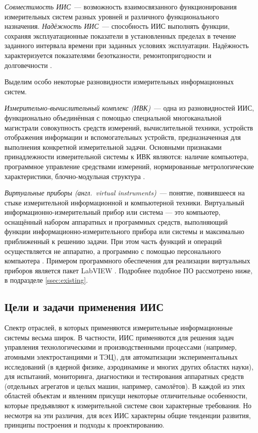 \documentclass[a4paper, 14pt, titlepage]{extarticle}
\newcommand{\eng}[1]{\foreignlanguage{english}{#1}}
\newcommand{\term}[1]{\emph{#1}}
\begin{document}
  \term{Совместимость ИИС}~--- возможность взаимосвязанного функционирования измерительных систем разных уровней и
  различного функционального назначения.
  \term{Надёжность ИИС}~--- способность ИИС выполнять функции, сохраняя эксплуатационные показатели
  в установленных пределах в течение заданного интервала времени при заданных условиях эксплуатации.
  Надёжность характеризуется показателями безотказности, ремонтопригодности и долговечности
  \cite[с.~5--7]{rannev-iis}.

  Выделим особо некоторые разновидности измерительных информационных систем.

  \term{Измерительно-вычислительный комплекс (ИВК)}~--- одна из разновидностей ИИС, функционально
  объединённая с помощью специальной многоканальной магистрали совокупность средств
  измерений, вычислительной техники, устройств отображения информации и вспомогательных устройств,
  предназначенная для выполнения конкретной измерительной задачи. Основными признаками
  принадлежности измерительной системы к ИВК являются: наличие компьютера, программное управление
  средствами измерений, нормированные метрологические характеристики, блочно-модульная структура \cite[с.~225]{rannev-iis}.

  \term{Виртуальные приборы (англ.~\eng{virtual instruments})}~--- понятие, появившееся на стыке
  измерительной информационной и компьютерной техники. Виртуальный информационно-измерительный
  прибор или система — это компьютер, оснащённый набором аппаратных и программных средств,
  выполняющий функции информационно-измерительного прибора или системы и максимально приближенный к
  решению задачи. При этом часть функций и операций осуществляется не аппаратно, а программно с
  помощью персонального компьютера \cite[с.~209]{rannev-iis}. Примером программного обеспечения для
  реализации виртуальных приборов является пакет LabVIEW \cite{lavrov-labview}. Подробнее подобное
  ПО рассмотрено ниже, в подразделе \ref{ssec:existing}.

  \subsection{Цели и задачи применения ИИС}

  Спектр отраслей, в которых применяются измерительные информационные системы весьма широк.
  В частности, ИИС применяются для решения задач управления технологическими и
  производственными процессами (например, атомными электростанциями и ТЭЦ), для автоматизации экспериментальных
  исследований (в ядерной физике, аэродинамике и многих других областях науки), для испытаний, мониторинга,
  диагностики и тестирования аппаратных средств (отдельных агрегатов и целых машин, например, самолётов). В
  каждой из этих областей объектам и явлениям присущи некоторые отличительные особенности, которые
  предъявляют к измерительной системе свои характерные требования. Но несмотря на эти различия,
  для всех ИИС характерны общие тенденции развития, принципы построения и подходы к проектированию.
\end{document}
